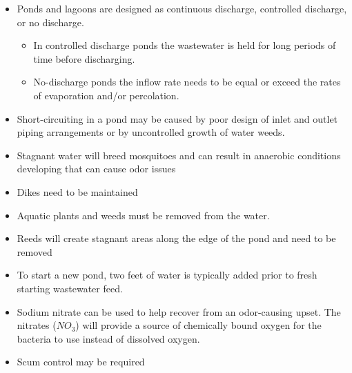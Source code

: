 \begin{itemize}
\item Ponds and lagoons are designed as continuous discharge, controlled discharge, or no discharge.
\begin{itemize}
\item In controlled discharge ponds the wastewater is held for long periods of time before discharging. 

\item No-discharge ponds the inflow rate needs to be equal or exceed the rates of evaporation and/or percolation. 
\end{itemize}
\item Short-circuiting in a pond may be caused by poor design of inlet and outlet piping arrangements or by uncontrolled growth of water weeds.
\item Stagnant water will breed mosquitoes and can result in anaerobic conditions developing that can cause odor issues 
\item Dikes need to be maintained
\item Aquatic plants and weeds must be removed from the water. 
\item Reeds will create stagnant areas along the edge of the pond and need to be removed
\item To start a new pond, two feet of water is typically added prior to fresh starting wastewater feed. 
\item Sodium nitrate can be used to help recover from an odor-causing upset. The nitrates ($NO_3$) will provide a source of chemically bound oxygen for the bacteria to use instead of dissolved oxygen.
\item Scum control may be required
\end{itemize}





\newpage
